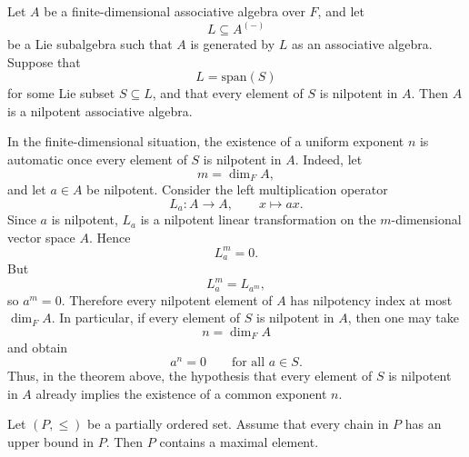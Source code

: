 \documentclass[11pt, a4paper]{report}
\begin{document}
    \begin{theorem}
    Let $A$ be a finite-dimensional associative algebra over $F$, and let
    \[
    L\subseteq A^{(-)}
    \]
    be a Lie subalgebra such that $A$ is generated by $L$ as an associative algebra. Suppose that
    \[
    L=\mathrm{span}(S)
    \]
    for some Lie subset $S\subseteq L$, and that every element of $S$ is nilpotent in $A$. Then $A$ is a nilpotent associative algebra.
    \end{theorem}

    \begin{remark}
        In the finite-dimensional situation, the existence of a uniform exponent $n$ is automatic once every element of $S$ is nilpotent in $A$. Indeed, let
        \[
        m=\dim_F A,
        \]
        and let $a\in A$ be nilpotent. Consider the left multiplication operator
        \[
        L_a:A\to A,\qquad x\mapsto ax.
        \]
        Since $a$ is nilpotent, $L_a$ is a nilpotent linear transformation on the $m$-dimensional vector space $A$. Hence
        \[
        L_a^m=0.
        \]
        But
        \[
        L_a^m=L_{a^m},
        \]
        so $a^m=0$. Therefore every nilpotent element of $A$ has nilpotency index at most $\dim_F A$. In particular, if every element of $S$ is nilpotent in $A$, then one may take
        \[
        n=\dim_F A
        \]
        and obtain
        \[
        a^n=0
        \qquad
        \text{for all } a\in S.
        \]
        Thus, in the theorem above, the hypothesis that every element of $S$ is nilpotent in $A$ already implies the existence of a common exponent $n$.
\end{remark}

\begin{theorem}
    Let $(P,\leq)$ be a partially ordered set. Assume that every chain in $P$ has an upper bound in $P$. Then $P$ contains a maximal element.
    \end{theorem}
    
\end{document}

